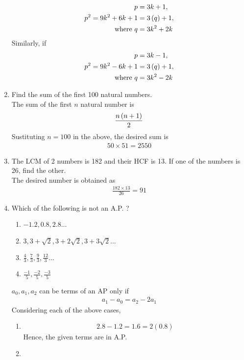 \documentclass[journal,12pt,twocolumn]{IEEEtran}
\begin{document}
\begin{enumerate}
\begin{align}
		    p &= 3k+1, 
		    \\
		    p^2 = 9k^2 + 6k + 1&= 3\left(q\right)+1, 
		    \\
		    \text{where } q &= 3k^2+2k
	    \end{align}
	    Similarly, if
	    \begin{align}
		    p &= 3k-1, 
		    \\
		    p^2 = 9k^2 - 6k + 1&= 3\left(q\right)+1, 
		    \\
		    \text{where } q &= 3k^2-2k
	    \end{align}
\item Find the sum of the first 100 natural numbers.\\
	\solution The sum of the first $n$ natural number is 
  \begin{align}
	  \frac{n\left(n+1\right)}{2}
  \end{align}
Sustituting $n = 100$ in the above, the desired sum is 
  \begin{align}
50 \times 51 = 2550	
  \end{align}
\item The LCM of 2 numbers is 182 and their HCF is 13. If one of the numbers is 26, find the other.\\
\solution The desired number is obtained as
  \begin{align}
	  \frac{182 \times 13}{26} = 91
  \end{align}
\item Which of the following is not an A.P. ?
\begin{enumerate}
    \item $-1.2, 0.8, 2.8...$
    \item $3, 3 + \sqrt{2}, 3 + 2\sqrt{2},3 + 3\sqrt{2}...$
    \item $\frac{4}{3}, \frac{7}{3}, \frac{9}{3}, \frac{12}{3}...$
    \item $\frac{-1}{5}, \frac{-2}{5}, \frac{-3}{5}$
\end{enumerate}
\solution $a_0, a_1, a_2$ can be terms of an AP only if 
		\begin{align}
	a_1 - 	a_0 = a_2 - 2a_1
		\end{align}
		Considering each of the above cases, 
		\begin{enumerate}
			\item 
				\begin{align}
					2.8 - 1.2 = 1.6 = 2(0.8)
				\end{align}
				Hence, the given terms are in A.P.
			\item 

\end{enumerate}
\end{enumerate}
\end{document}
